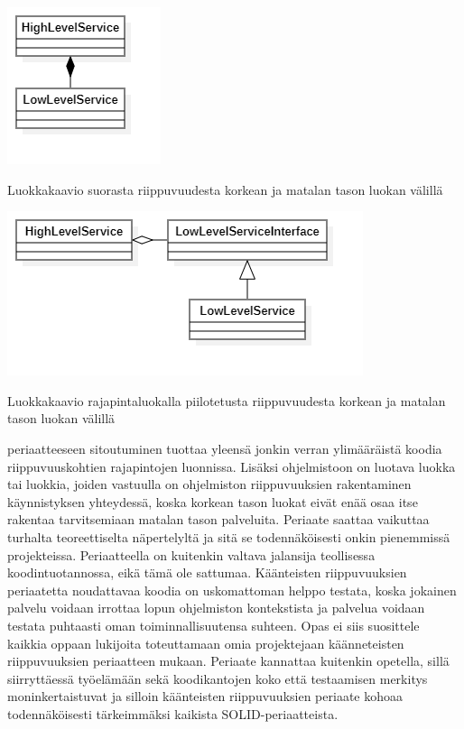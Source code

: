 \documentclass[a4paper,justified,notoc]{tufte-book}
\begin{document}
\begin{fullwidth}
\begin{listing}
    \includegraphics{NoDIPExample}
    \caption{Luokkakaavio suorasta riippuvuudesta korkean ja matalan tason luokan välillä}
    \label{luokkakaavioluokka}
\end{listing}

\begin{listing}
    \includegraphics{DIPExample}
    \caption{Luokkakaavio rajapintaluokalla piilotetusta riippuvuudesta korkean ja matalan tason luokan välillä}
    \label{luokkakaavioluokka}
\end{listing}

 periaatteeseen sitoutuminen tuottaa yleensä jonkin verran
ylimääräistä koodia riippuvuuskohtien rajapintojen luonnissa. Lisäksi ohjelmistoon on luotava
luokka tai luokkia, joiden vastuulla on ohjelmiston riippuvuuksien rakentaminen käynnistyksen
yhteydessä, koska korkean tason luokat eivät enää osaa itse rakentaa tarvitsemiaan matalan tason
palveluita. Periaate saattaa vaikuttaa turhalta teoreettiselta näpertelyltä ja sitä se
todennäköisesti onkin pienemmissä projekteissa. Periaatteella on kuitenkin valtava jalansija
teollisessa koodintuotannossa, eikä tämä ole sattumaa. Käänteisten riippuvuuksien periaatetta
noudattavaa koodia on uskomattoman helppo testata, koska jokainen palvelu voidaan irrottaa lopun
ohjelmiston kontekstista ja palvelua voidaan testata puhtaasti oman toiminnallisuutensa suhteen.
Opas ei siis suosittele kaikkia oppaan lukijoita toteuttamaan omia projektejaan käänneteisten
riippuvuuksien periaatteen mukaan. Periaate kannattaa kuitenkin opetella, sillä siirryttäessä
työelämään sekä koodikantojen koko että testaamisen merkitys moninkertaistuvat ja silloin
käänteisten riippuvuuksien periaate kohoaa todennäköisesti tärkeimmäksi kaikista 
SOLID-periaatteista.


\end{fullwidth}
\end{document}
